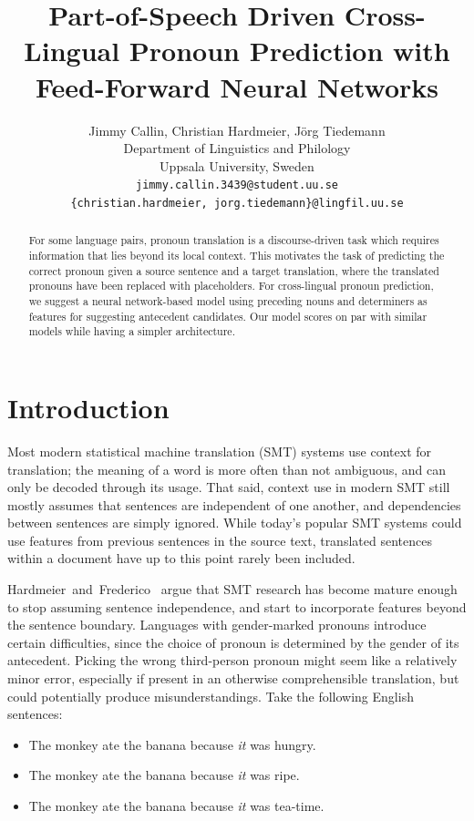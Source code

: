 \documentclass[11pt]{article}
\title{Part-of-Speech Driven Cross-Lingual Pronoun Prediction with Feed-Forward Neural Networks}
\author{Jimmy Callin, Christian Hardmeier, Jörg Tiedemann \\
  Department of Linguistics and Philology \\
  Uppsala University, Sweden \\
  {\tt \normalsize jimmy.callin.3439@student.uu.se} \\ {\tt \normalsize \{christian.hardmeier, jorg.tiedemann\}@lingfil.uu.se}}
\date{}
\begin{document}
\maketitle
\begin{abstract}
    For some language pairs, pronoun translation is a discourse-driven task which requires information that lies beyond its local context. This motivates the task of predicting the correct pronoun given a source sentence and a target translation, where the translated pronouns have been replaced with placeholders. For cross-lingual pronoun prediction, we suggest a neural network-based model using preceding nouns and determiners as features for suggesting antecedent candidates. Our model scores on par with similar models while having a simpler architecture.
\end{abstract}


\section{Introduction}

Most modern statistical machine translation (SMT) systems use context for translation; the meaning of a word is more often than not ambiguous, and can only be decoded through its usage.
That said, context use in modern SMT still mostly assumes that sentences are independent of one another, and dependencies between sentences are simply ignored.
While today's popular SMT systems could use features from previous sentences in the source text, translated sentences within a document have up to this point rarely been included.

Hardmeier~and~Frederico~ argue that SMT research has become mature enough to stop assuming sentence independence, and start to incorporate features beyond the sentence boundary.
Languages with gender-marked pronouns introduce certain difficulties, since the choice of pronoun is determined by the gender of its antecedent.
Picking the wrong third-person pronoun might seem like a relatively minor error, especially if present in an otherwise comprehensible translation, but could potentially produce misunderstandings. Take the following English sentences:

\begin{itemize}
    \setlength{\itemsep}{-0.2em}
    \item The monkey ate the banana because \emph{it} was hungry.
    \item The monkey ate the banana because \emph{it} was ripe.
    \item The monkey ate the banana because \emph{it} was tea-time.
\end{itemize}
\end{document}
